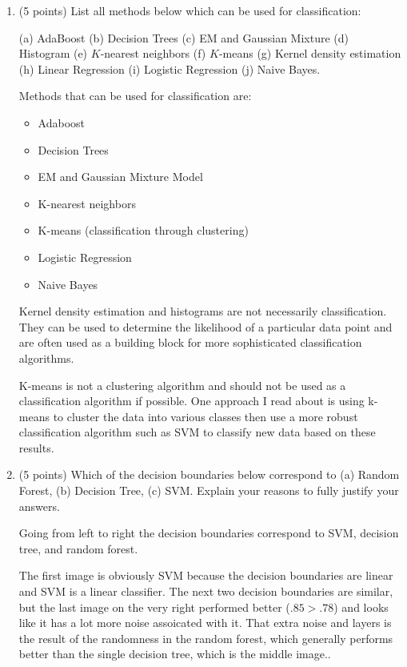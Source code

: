 \documentclass[a4paper,12pt,fleqn]{article}
\begin{document}
\begin{enumerate}
\item (5 points) List all methods below which can be used for classification:

(a) AdaBoost (b) Decision Trees (c) EM and Gaussian Mixture (d) Histogram (e) $K$-nearest neighbors (f) $K$-means (g) Kernel density estimation 
(h) Linear Regression (i) Logistic Regression (j) Naive Bayes. 



\vspace{.15in}
Methods that can be used for classification are:
\begin{itemize}
\item Adaboost
\item Decision Trees
\item EM and Gaussian Mixture Model
\item K-nearest neighbors
\item K-means (classification through clustering)
\item Logistic Regression
\item Naive Bayes

\end{itemize}
Kernel density estimation and histograms are not necessarily classification.  They can be used to determine the likelihood of a particular data point and are often used as a building block for more sophisticated classification algorithms.

K-means is not a clustering algorithm and should not be used as a classification algorithm if possible.  One approach I read about is using k-means to cluster the data into various classes then use a more robust classification algorithm such as SVM to classify new data based on these results.
\vspace{.15in}



\item (5 points) Which of the decision boundaries below correspond to (a) Random Forest, (b) Decision Tree, (c) SVM. Explain your reasons  to fully justify your answers. 

\vspace{.15in}

Going from left to right the decision boundaries correspond to SVM, decision tree, and random forest.

The first image is obviously SVM because the decision boundaries are linear and SVM is a linear classifier.  The next two decision boundaries are similar, but the last image on the very right performed better ($.85 > .78$) and looks like it has a lot more noise assoicated with it.  That extra noise and layers is the result of the randomness in the random forest, which generally performs better than the single decision tree, which is the middle image..


\end{enumerate}
\end{document}

